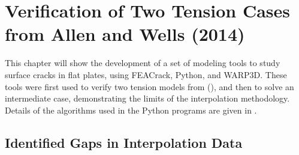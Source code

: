 \chapter{Verification of Two Tension Cases from Allen and Wells (2014)} \label{chap:verification-allen-wells}

\begin{frame}
\end{frame}

This chapter will show the development of a set of modeling tools to study surface cracks in flat plates, using FEACrack, Python, and WARP3D.
These tools were first used to verify two tension models from \citeauthor{allenwells2014} (\citeyear{allenwells2014}), and then to solve an intermediate case, demonstrating the limits of the interpolation methodology.
Details of the algorithms used in the Python programs are given in .

\section{Identified Gaps in Interpolation Data}

